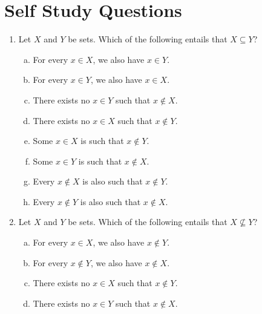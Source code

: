 \section{Self Study Questions}

	\begin{enumerate}[\thesection.1]
	
		\item Let $X$ and $Y$ be sets. Which of the following entails that $X\subseteq Y$?
		
		\begin{enumerate}[(a)]
		
			\item For every $x\in X$, we also have $x\in Y$.
			
			\item For every $x\in Y$, we also have $x\in X$.
			
			\item There exists no $x\in Y$ such that $x\notin X$.
			
			\item There exists no $x\in X$ such that $x\notin Y$.
			
			\item Some $x\in X$ is such that $x\notin Y$.
			
			\item Some $x\in Y$ is such that $x\notin X$.
			
			\item Every $x\notin X$ is also such that $x\notin Y$.
			
			\item Every $x\notin Y$ is also such that $x\notin X$.		
					
		\end{enumerate}

		\item Let $X$ and $Y$ be sets. Which of the following entails that $X\nsubseteq Y$?
		
		\begin{enumerate}[(a)]
		
			\item For every $x\in X$, we also have $x\notin Y$.
			
			\item For every $x\notin Y$, we also have $x\notin X$.
			
			\item There exists no $x\in X$ such that $x\notin Y$.
			
			\item There exists no $x\in Y$ such that $x\notin X$.
			

\end{enumerate}
\end{enumerate}
